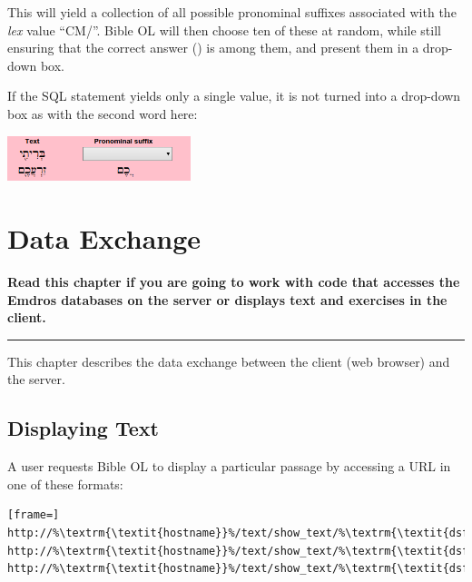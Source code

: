 \documentclass[11pt,oneside,a4paper]{memoir}
\newcommand{\heb}[1]{{\RL {\ezr #1}}}
\begin{document}
This will yield a collection of all possible pronominal suffixes associated with the \emph{lex}
value ``CM/''. Bible OL will then choose ten of these at random, while still ensuring that the
correct answer (\heb{ֹו}) is among them, and present them in a drop-down box.

If the SQL statement yields only a single value, it is not turned into a drop-down box as with the second
word here:

\begin{center}
  \includegraphics[width=0.4\textwidth]{pronsuf2.png}
\end{center}


\chapter{Data Exchange}\label{chap-data-exchange}

\textbf{Read this chapter if you are going to work with code that accesses the Emdros databases on
  the server or displays text and exercises in the client.}
\plainbreak{3}

This chapter describes the data exchange between the client (web browser)
and the server.

\section{Displaying Text}\label{displaying-text}

A user requests Bible OL to display a particular passage by accessing a URL%
in one of these formats:

\begin{lstlisting}[frame=]
http://%\textrm{\textit{hostname}}%/text/show_text/%\textrm{\textit{dsfname}}%/%\textrm{\textit{book}}%/%\textrm{\textit{chapter}}%
http://%\textrm{\textit{hostname}}%/text/show_text/%\textrm{\textit{dsfname}}%/%\textrm{\textit{book}}%/%\textrm{\textit{chapter}}%/%\textrm{\textit{verse}}%
http://%\textrm{\textit{hostname}}%/text/show_text/%\textrm{\textit{dsfname}}%/%\textrm{\textit{book}}%/%\textrm{\textit{chapter}}%/%\textrm{\textit{firstverse}}%/%\textrm{\textit{lastverse}}%
\end{lstlisting}
\end{document}
